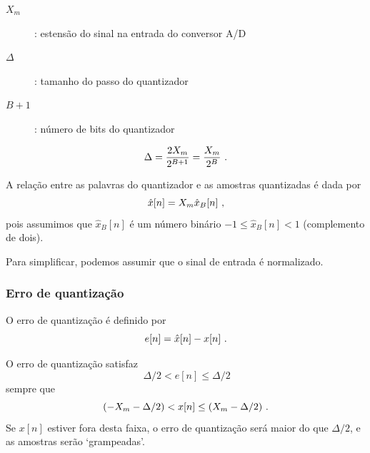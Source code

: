 \begin{frame}[allowframebreaks]
  \framebreak

  \begin{description}
  \item[$X_m$]: estensão do sinal na entrada do conversor A/D
  \item[$\Delta$]: tamanho do passo do quantizador
  \item[$B+1$]: número de bits do quantizador
  \end{description}
 
  \begin{equation}
  \label{eq-Xm-B}
  \Delta = \frac{2 X_m}{2^{B+1}} = \frac{X_m}{2^B} \textmd{ .}
  \end{equation}

  A relação entre as palavras do quantizador e as amostras quantizadas é dada por
  \begin{equation}
  \hat{x}[n] = X_m \hat{x}_B [n] \textmd{ ,}
  \end{equation}
  pois assumimos que $\hat{x}_B [n]$ é um número binário $-1 \leq \hat{x}_B [n] < 1$ (complemento de dois).

  Para simplificar, podemos assumir que o sinal de entrada é normalizado.

\end{frame}

\begin{frame}[allowframebreaks]
  \frametitle{Erro de quantização} 

  O erro de quantização é definido por
  \begin{equation}
  e[n] = \hat{x} [n] - x[n] \textmd{ .}
  \end{equation}

  O erro de quantização satisfaz
  \begin{equation}
  \ \Delta/2 < e[n] \leq \Delta/2
  \end{equation}
  sempre que
  \begin{equation}
  (- X_m - \Delta/2) < x[n] \leq (X_m - \Delta/2) \textmd{ .}
  \end{equation}
  Se $x[n]$ estiver fora desta faixa, o erro de quantização será maior do que $\Delta/2$, e as amostras
  serão `grampeadas'.
\end{frame}

